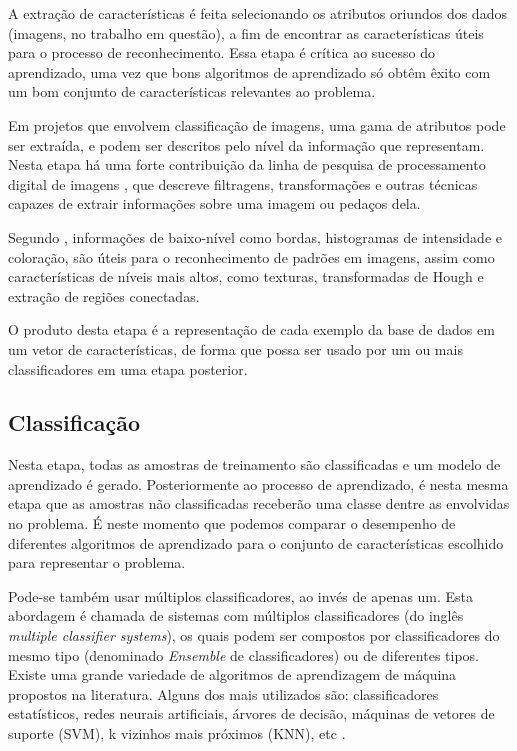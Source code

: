 A extração de características é feita selecionando os atributos oriundos dos dados (imagens, no trabalho em questão), a fim de encontrar as características úteis para o processo de reconhecimento. Essa etapa é crítica ao sucesso do aprendizado, uma vez que bons algoritmos de aprendizado só obtêm êxito com um bom conjunto de características relevantes ao problema.

Em projetos que envolvem classificação de imagens, uma gama de atributos pode ser extraída, e podem ser descritos pelo nível da informação que representam. Nesta etapa há uma forte contribuição da linha de pesquisa de processamento digital de imagens \cite{gonzalez:2002}, que descreve filtragens, transformações e outras técnicas capazes de extrair informações sobre uma imagem ou pedaços dela.

Segundo , informações de baixo-nível como bordas, histogramas de intensidade e coloração, são úteis para o reconhecimento de padrões em imagens, assim como características de níveis mais altos, como texturas, transformadas de Hough e extração de regiões conectadas.

O produto desta etapa é a representação de cada exemplo da base de dados em um vetor de características, de forma que possa ser usado por um ou mais classificadores em uma etapa posterior.


\subsection{Classificação}\label{sec:classificacao}

Nesta etapa, todas as amostras de treinamento são classificadas e um modelo de aprendizado é gerado. Posteriormente ao processo de aprendizado, é nesta mesma etapa que as amostras não classificadas receberão uma classe dentre as envolvidas no problema. É neste momento que podemos comparar o desempenho de diferentes algoritmos de aprendizado para o conjunto de características escolhido para representar o problema.

Pode-se também usar múltiplos classificadores, ao invés de apenas um. Esta abordagem é chamada de sistemas com múltiplos classificadores (do inglês \textit{multiple classifier systems}), os quais podem ser compostos por classificadores do mesmo tipo (denominado \textit{Ensemble} de classificadores) ou de diferentes tipos. Existe uma grande variedade de algoritmos de aprendizagem de máquina propostos na literatura. Alguns dos mais utilizados são: classificadores estatísticos, redes neurais artificiais, árvores de decisão, máquinas de vetores de suporte (SVM), k vizinhos mais próximos (KNN), etc \cite{jain:1989}.

